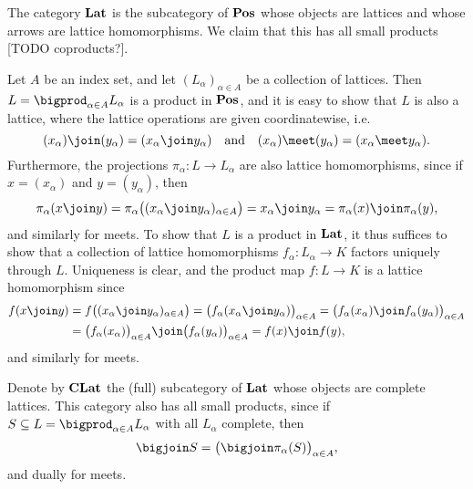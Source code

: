 \documentclass[article, a4paper, 11pt, oneside]{memoir}
\numberwithin{equation}{chapter}
\theoremstyle{nonumberplain}
\begin{document}
\begin{remarkbreak}
    The category $\mathbf{Lat}$ is the subcategory of $\mathbf{Pos}$ whose objects are lattices and whose arrows are lattice homomorphisms. We claim that this has all small products [TODO coproducts?].

    Let $A$ be an index set, and let $(L_\alpha)_{\alpha \in A}$ be a collection of lattices. Then $L = \bigprod_{\alpha \in A} L_\alpha$ is a product in $\mathbf{Pos}$, and it is easy to show that $L$ is also a lattice, where the lattice operations are given coordinatewise, i.e.
    \begin{equation*}
        (x_\alpha) \join (y_\alpha)
            = (x_\alpha \join y_\alpha)
        \quad \text{and} \quad
        (x_\alpha) \meet (y_\alpha)
            = (x_\alpha \meet y_\alpha).
    \end{equation*}
    Furthermore, the projections $\pi_\alpha \colon L \to L_\alpha$ are also lattice homomorphisms, since if $x = (x_\alpha)$ and $y = (y_\alpha)$, then
    \begin{equation*}
        \pi_\alpha(x \join y)
            = \pi_\alpha \bigl( (x_\alpha \join y_\alpha)_{\alpha \in A} \bigr)
            = x_\alpha \join y_\alpha
            = \pi_\alpha(x) \join \pi_\alpha(y),
    \end{equation*}
    and similarly for meets. To show that $L$ is a product in $\mathbf{Lat}$, it thus suffices to show that a collection of lattice homomorphisms $f_\alpha \colon L_\alpha \to K$ factors uniquely through $L$. Uniqueness is clear, and the product map $f \colon L \to K$ is a lattice homomorphism since
    \begin{align*}
        f(x \join y)
            &= f \bigl( (x_\alpha \join y_\alpha)_{\alpha \in A} \bigr)
             = \bigl( f_\alpha(x_\alpha \join y_\alpha) \bigr)_{\alpha \in A}
             = \bigl( f_\alpha(x_\alpha) \join f_\alpha(y_\alpha) \bigr)_{\alpha \in A} \\
            &= \bigl( f_\alpha(x_\alpha) \bigr)_{\alpha \in A} \join \bigl( f_\alpha(y_\alpha) \bigr)_{\alpha \in A}
             = f(x) \join f(y),
    \end{align*}
    and similarly for meets.

    Denote by $\mathbf{CLat}$ the (full) subcategory of $\mathbf{Lat}$ whose objects are complete lattices. This category also has all small products, since if $S \subseteq L = \bigprod_{\alpha \in A} L_\alpha$ with all $L_\alpha$ complete, then
    \begin{equation*}
        \bigjoin S
            = \bigl( \bigjoin \pi_\alpha(S) \bigr)_{\alpha \in A},
    \end{equation*}
    and dually for meets.
\end{remarkbreak}
\end{document}
